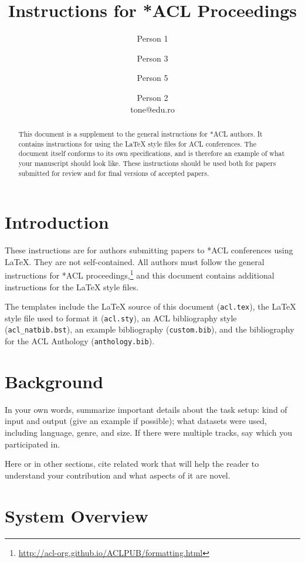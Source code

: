 \documentclass[11pt]{article}
\title{Instructions for *ACL Proceedings}
\author{Person 1\and Person 3 \and Person 5 \and Person 2\\
        {tone}@edu.ro}
\begin{document}
\maketitle
\begin{abstract}
This document is a supplement to the general instructions for *ACL authors. It contains instructions for using the \LaTeX{} style files for ACL conferences.
The document itself conforms to its own specifications, and is therefore an example of what your manuscript should look like.
These instructions should be used both for papers submitted for review and for final versions of accepted papers.
\end{abstract}

\section{Introduction}

These instructions are for authors submitting papers to *ACL conferences using \LaTeX. They are not self-contained. All authors must follow the general instructions for *ACL proceedings,\footnote{\url{http://acl-org.github.io/ACLPUB/formatting.html}} and this document contains additional instructions for the \LaTeX{} style files.

The templates include the \LaTeX{} source of this document (\texttt{acl.tex}),
the \LaTeX{} style file used to format it (\texttt{acl.sty}),
an ACL bibliography style (\texttt{acl\_natbib.bst}),
an example bibliography (\texttt{custom.bib}),
and the bibliography for the ACL Anthology (\texttt{anthology.bib}).

\section{Background}



In your own words, summarize important details about the task setup: kind of input and output (give an example if possible); what datasets were used, including language, genre, and size. If there were multiple tracks, say which you participated in.

Here or in other sections, cite related work that will help the reader to understand your contribution and what aspects of it are novel.

\section{System Overview}
\end{document}
